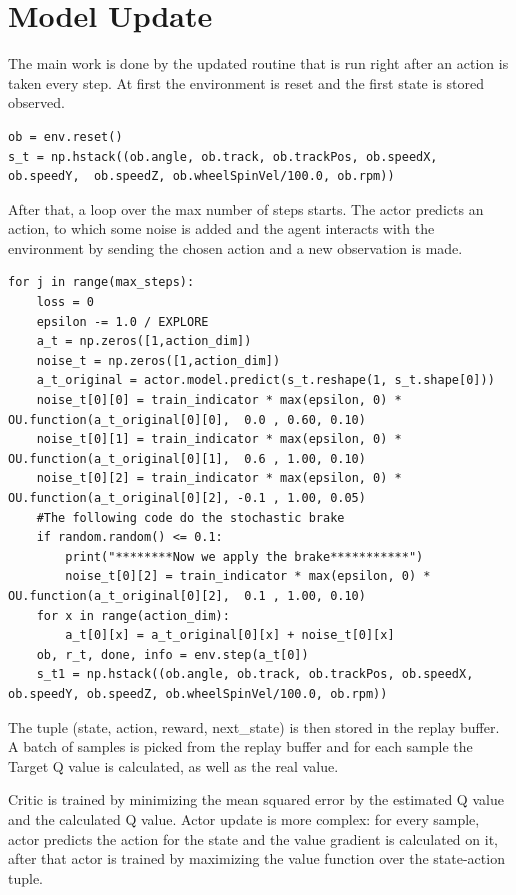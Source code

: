 \documentclass[Lau,oneside,noexaminfo]{sapthesis} %
\begin{document}
\section{Model Update}
The main work is done by the updated routine that is run right after an action is taken every step.
At first the environment is reset and the first state is stored observed.
\begin{lstlisting}
ob = env.reset()
s_t = np.hstack((ob.angle, ob.track, ob.trackPos, ob.speedX, ob.speedY,  ob.speedZ, ob.wheelSpinVel/100.0, ob.rpm))
\end{lstlisting}
After that, a loop over the max number of steps starts. The actor predicts an action, to which some noise is added and the agent interacts with the environment by sending the chosen action and a new observation is made.
\begin{lstlisting}[firstnumber=3]
for j in range(max_steps):
    loss = 0 
    epsilon -= 1.0 / EXPLORE
    a_t = np.zeros([1,action_dim])
    noise_t = np.zeros([1,action_dim])
    a_t_original = actor.model.predict(s_t.reshape(1, s_t.shape[0]))
    noise_t[0][0] = train_indicator * max(epsilon, 0) * OU.function(a_t_original[0][0],  0.0 , 0.60, 0.10)
    noise_t[0][1] = train_indicator * max(epsilon, 0) * OU.function(a_t_original[0][1],  0.6 , 1.00, 0.10)
    noise_t[0][2] = train_indicator * max(epsilon, 0) * OU.function(a_t_original[0][2], -0.1 , 1.00, 0.05)
    #The following code do the stochastic brake
    if random.random() <= 0.1:
        print("********Now we apply the brake***********")
        noise_t[0][2] = train_indicator * max(epsilon, 0) * OU.function(a_t_original[0][2],  0.1 , 1.00, 0.10)
    for x in range(action_dim):
        a_t[0][x] = a_t_original[0][x] + noise_t[0][x]
    ob, r_t, done, info = env.step(a_t[0])
    s_t1 = np.hstack((ob.angle, ob.track, ob.trackPos, ob.speedX, ob.speedY, ob.speedZ, ob.wheelSpinVel/100.0, ob.rpm))
\end{lstlisting}
The tuple (state, action, reward, next\_state) is then stored in the replay buffer. A batch of samples is picked from the replay buffer and for each sample the Target Q value is calculated, as well as the real value. 

Critic is trained by minimizing the mean squared error by the estimated Q value and the calculated Q value. Actor update is more complex: for every sample, actor predicts the action for the state and the value gradient is calculated on it, after that actor is trained by maximizing the value function over the state-action tuple. 
\end{document}
